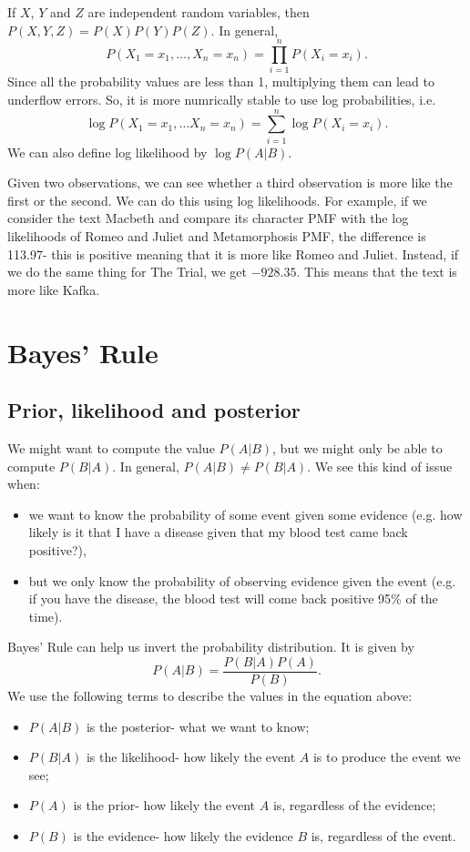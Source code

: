 \documentclass[a4paper, openany]{memoir}
\begin{document}
If $X$, $Y$ and $Z$ are independent random variables, then $P(X, Y, Z) = P(X) P(Y) P(Z)$. In general, 
\[P(X_1 = x_1, \dots, X_n = x_n) = \prod_{i=1}^n P(X_i = x_i).\]
Since all the probability values are less than 1, multiplying them can lead to underflow errors. So, it is more numrically stable to use log probabilities, i.e.
\[\log P(X_1 = x_1, \dots X_n = x_n) = \sum_{i=1}^n \log P(X_i = x_i).\]
We can also define log likelihood by $\log P(A|B)$. 


Given two observations, we can see whether a third observation is more like the first or the second. We can do this using log likelihoods. For example, if we consider the text Macbeth and compare its character PMF with the log likelihoods of Romeo and Juliet and Metamorphosis PMF, the difference is 113.97- this is positive meaning that it is more like Romeo and Juliet. Instead, if we do the same thing for The Trial, we get $-928.35$. This means that the text is more like Kafka.

\section{Bayes' Rule}
\subsection{Prior, likelihood and posterior}
We might want to compute the value $P(A|B)$, but we might only be able to compute $P(B|A)$. In general, $P(A|B) \neq P(B|A)$. We see this kind of issue when:
\begin{itemize}
    \item we want to know the probability of some event given some evidence (e.g. how likely is it that I have a disease given that my blood test came back positive?),
    \item but we only know the probability of observing evidence given the event (e.g. if you have the disease, the blood test will come back positive 95\% of the time).
\end{itemize}
Bayes' Rule can help us invert the probability distribution. It is given by
\[P(A|B) = \frac{P(B|A)P(A)}{P(B)}.\]
We use the following terms to describe the values in the equation above:
\begin{itemize}
    \item $P(A|B)$ is the posterior- what we want to know;
    \item $P(B|A)$ is the likelihood- how likely the event $A$ is to produce the event we see;
    \item $P(A)$ is the prior- how likely the event $A$ is, regardless of the evidence;
    \item $P(B)$ is the evidence- how likely the evidence $B$ is, regardless of the event.
\end{itemize}
\end{document}
